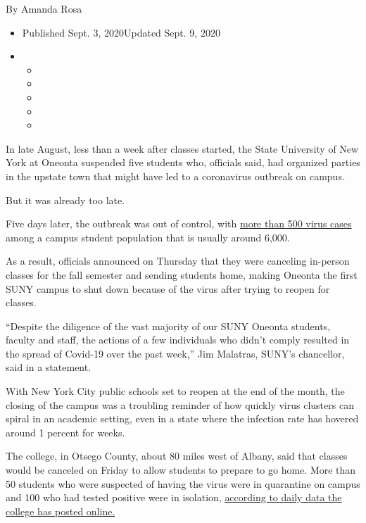 By Amanda Rosa

\begin{itemize}
\item
  Published Sept. 3, 2020Updated Sept. 9, 2020
\item
  \begin{itemize}
  \item
  \item
  \item
  \item
  \item
  \end{itemize}
\end{itemize}

In late August, less than a week after classes started, the State
University of New York at Oneonta suspended five students who, officials
said, had organized parties in the upstate town that might have led to a
coronavirus outbreak on campus.

But it was already too late.

Five days later, the outbreak was out of control, with
\href{https://t.e2ma.net/message/l0xndc/96qt6se}{more than 500 virus
cases} among a campus student population that is usually around 6,000.

As a result, officials announced on Thursday that they were canceling
in-person classes for the fall semester and sending students home,
making Oneonta the first SUNY campus to shut down because of the virus
after trying to reopen for classes.

``Despite the diligence of the vast majority of our SUNY Oneonta
students, faculty and staff, the actions of a few individuals who didn't
comply resulted in the spread of Covid-19 over the past week,'' Jim
Malatras, SUNY's chancellor, said in a statement.

With New York City public schools set to reopen at the end of the month,
the closing of the campus was a troubling reminder of how quickly virus
clusters can spiral in an academic setting, even in a state where the
infection rate has hovered around 1 percent for weeks.

The college, in Otsego County, about 80 miles west of Albany, said that
classes would be canceled on Friday to allow students to prepare to go
home. More than 50 students who were suspected of having the virus were
in quarantine on campus and 100 who had tested positive were in
isolation, \href{https://suny.oneonta.edu/covid-19}{according to daily
data the college has posted online.}

